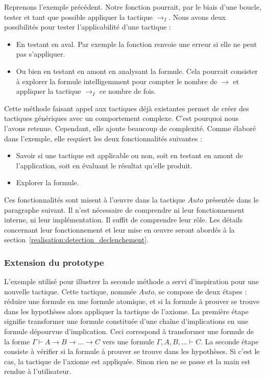 \documentclass[french,titlepage]{article}
\begin{document}
Reprenons l'exemple précédent. Notre fonction pourrait, par le biais d'une boucle, tester et tant que possible appliquer la tactique $\to_I$. Nous avons deux possibilités pour tester l'applicabilité d'une tactique :
\begin{itemize}
    \item En testant en aval. Par exemple la fonction renvoie une erreur si elle ne peut pas s'appliquer.
    \item Ou bien en testant en amont en analysant la formule. Cela pourrait consister à explorer la formule intelligemment pour compter le nombre de $\to$ et appliquer la tactique $\to_I$ ce nombre de fois.
\end{itemize}


Cette méthode faisant appel aux tactiques déjà existantes permet de créer des tactiques génériques avec un comportement complexe. C'est pourquoi nous l'avons retenue. Cependant, elle ajoute beaucoup de complexité. Comme élaboré dans l'exemple, elle requiert les deux fonctionnalités suivantes :
\begin{itemize}
    \item Savoir si une tactique est applicable ou non, soit en testant en amont de l'application, soit en évaluant le résultat qu'elle produit.
    \item Explorer la formule.
\end{itemize}
Ces fonctionnalités sont misent à l'œuvre dans la tactique $Auto$ présentée dans le paragraphe suivant. Il n'est nécessaire de comprendre ni leur fonctionnement interne, ni leur implémentation. Il suffit de comprendre leur rôle. Les détails concernant leur fonctionnement et leur mise en œuvre seront abordés à la section~\ref{realisation:detection_declenchement}.

\subsubsection{Extension du prototype} \label{realisation:composition_tactiques:extension_proto}
L'exemple utilisé pour illustrer la seconde méthode a servi d'inspiration pour une nouvelle tactique. Cette tactique, nommée $Auto$, se compose de deux étapes : réduire une formule en une formule atomique, et si la formule à prouver se trouve dans les hypothèses alors appliquer la tactique de l'axiome. La première étape signifie transformer une formule constituée d'une chaîne d'implications en une formule dépourvue d'implication. Ceci correspond à transformer une formule de la forme $\Gamma \vdash A \to B \to \dots \to C $ vers une formule $\Gamma, A, B, \dots \vdash C$. La seconde étape consiste à vérifier si la formule à prouver se trouve dans les hypothèses. Si c'est le cas, la tactique de l'axiome est appliquée. Sinon rien ne se passe et la main est rendue à l'utilisateur.
\end{document}
